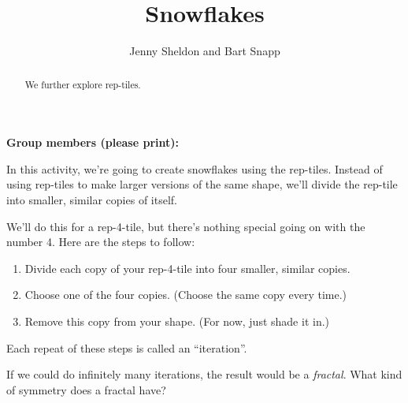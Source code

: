 \documentclass[handout,noauthor,nooutcomes]{ximera}
\title{Snowflakes}
\author{Jenny Sheldon and Bart Snapp}
\begin{document}
\begin{abstract}
  We further explore rep-tiles.
\end{abstract}
\maketitle

\noindent\textbf{Group members (please print):}\ \hrulefill \\

\hrulefill

In this activity, we're going to create snowflakes using the
rep-tiles.  Instead of using rep-tiles to make larger versions of the
same shape, we'll divide the rep-tile into smaller, similar copies of
itself.

We'll do this for a rep-4-tile, but there's nothing special going on
with the number 4.  Here are the steps to follow:
\begin{enumerate}
	\item Divide each copy of your rep-4-tile into four smaller, similar copies.
	\item Choose one of the four copies.  (Choose the same copy every time.)
	\item Remove this copy from your shape.  (For now, just shade it in.)
\end{enumerate}
  Each repeat of these steps is called an ``iteration''.
  
If we could do infinitely many iterations, the result would be a \textit{fractal}.  What kind of symmetry does a fractal have?
\end{document}
